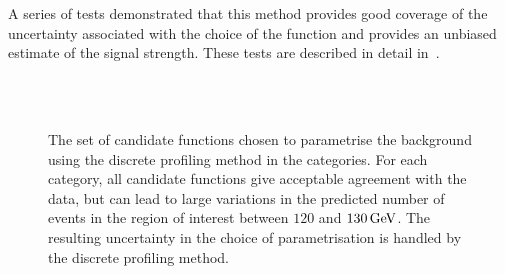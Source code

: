 A series of tests demonstrated that this method provides good coverage of the uncertainty associated with the choice of the function and provides an unbiased estimate of the signal strength. These tests are described in detail in~\cite{DiscreteProfiling}. 

\begin{figure}[p]
 \begin{center}
 \\
 \\
 \caption{The set of candidate functions chosen to parametrise the background using the discrete profiling method in the \Untagged categories. For each category, all candidate functions give acceptable agreement with the data, but can lead to large variations in the predicted number of events in the region of interest between $120$ and $130\,\text{Ge\hspace{-.08em}V}$. The resulting uncertainty in the choice of parametrisation is handled by the discrete profiling method.}
 \label{fig:model_bkg_multipdf}
 \end{center}
\end{figure}

